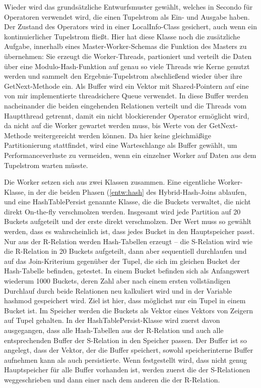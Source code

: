\documentclass[a4paper,12pt,twoside]{article}
\begin{document}
Wieder wird das grundsätzliche Entwurfsmuster gewählt, welches in Secondo für Operatoren verwendet wird, die einen Tupelstrom als Ein- und Ausgabe haben. Der Zustand des Operators wird in einer LocalInfo-Class gesichert, auch wenn ein kontinuierlicher Tupelstrom fließt. Hier hat diese Klasse noch die zusätzliche Aufgabe, innerhalb eines Master-Worker-Schemas die Funktion des Masters zu übernehmen: Sie erzeugt die Worker-Threads, partioniert und verteilt die Daten über eine Modulo-Hash-Funktion auf genau so viele Threads wie Kerne genutzt werden und sammelt den Ergebnis-Tupelstrom abschließend wieder über ihre GetNext-Methode ein. Als Buffer wird ein Vektor mit Shared-Pointern auf eine von mir implementierte threadsichere Queue verwendet. In diese Buffer werden nacheinander die beiden eingehenden Relationen verteilt und die Threads vom Hauptthread getrennt, damit ein nicht blockierender Operator ermöglicht wird, da nicht auf die Worker gewartet werden muss, bis Werte von der GetNext-Methode weitergereicht werden können. Da hier keine gleichmäßige Partitionierung stattfindet, wird eine Warteschlange als Buffer gewählt, um Performanceverluste zu vermeiden, wenn ein einzelner Worker auf Daten aus dem Tupelstrom warten müsste.

Die Worker setzen sich aus zwei Klassen zusammen. Eine eigentliche Worker-Klasse, in der die beiden Phasen (\autoref{entw:hash} des Hybrid-Hash-Joins ablaufen, und eine HashTablePersist genannte Klasse, die die Buckets verwaltet, die nicht direkt On-the-fly verschmolzen werden. Insgesamt wird jede Partition auf 20 Buckets aufgeteilt und der erste direkt verschmolzen. Der Wert muss so gewählt werden, dass es wahrscheinlich ist, dass jedes Bucket in den Hauptspeicher passt. Nur aus der R-Relation werden Hash-Tabellen erzeugt -- die S-Relation wird wie die R-Relation in 20 Buckets aufgeteilt, dann aber sequentiell durchlaufen und auf das Join-Kriterium gegenüber der Tupel, die sich im gleichen Bucket der Hash-Tabelle befinden, getestet. In einem Bucket befinden sich als Anfangswert wiederum 1000 Buckets, deren Zahl aber nach einem ersten vollständigen Durchlauf durch beide Relationen neu kalkuliert wird und in der Variable hashmod gespeichert wird. Ziel ist hier, dass möglichst nur ein Tupel in einem Bucket ist. Im Speicher werden die Buckets als Vektor eines Vektors von Zeigern auf Tupel gehalten. In der HashTablePersist-Klasse wird zuerst davon ausgegangen, dass alle Hash-Tabellen aus der R-Relation und auch alle entsprechenden Buffer der S-Relation in den Speicher passen. Der Buffer ist so angelegt, dass der Vektor, der die Buffer speichert, sowohl speicherinterne Buffer aufnehmen kann als auch persistierte. Wenn festgestellt wird, dass nicht genug Hauptspeicher für alle Buffer vorhanden ist, werden zuerst die der S-Relationen weggeschrieben und dann einer nach dem anderen die der R-Relation.
\end{document}
